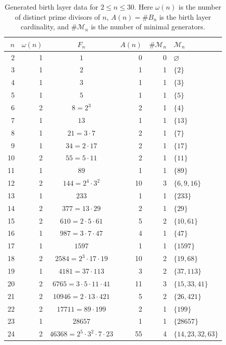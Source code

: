 \begin{table}[ht]
\centering
\small
\caption{Generated birth layer data for $2 \le n \le 30$. Here $\omega(n)$ is the number of distinct prime divisors of $n$, $A(n)=\#B_n$ is the birth layer cardinality, and $\#\mathcal{M}_n$ is the number of minimal generators.}
\label{tab:birth-layer-data-generated}
\begin{tabular}{rrcrrl}
\toprule
$n$ & $\omega(n)$ & $F_n$ & $A(n)$ & $\#\mathcal{M}_n$ & $\mathcal{M}_n$ \\
\midrule
  2 & 1 & $1$ & 0 & 0 & $\varnothing$ \\
  3 & 1 & $2$ & 1 & 1 & $\{2\}$ \\
  4 & 1 & $3$ & 1 & 1 & $\{3\}$ \\
  5 & 1 & $5$ & 1 & 1 & $\{5\}$ \\
  6 & 2 & $8 = 2^{3}$ & 2 & 1 & $\{4\}$ \\
  7 & 1 & $13$ & 1 & 1 & $\{13\}$ \\
  8 & 1 & $21 = 3 \cdot 7$ & 2 & 1 & $\{7\}$ \\
  9 & 1 & $34 = 2 \cdot 17$ & 2 & 1 & $\{17\}$ \\
  10 & 2 & $55 = 5 \cdot 11$ & 2 & 1 & $\{11\}$ \\
  11 & 1 & $89$ & 1 & 1 & $\{89\}$ \\
  12 & 2 & $144 = 2^{4} \cdot 3^{2}$ & 10 & 3 & $\{6,9,16\}$ \\
  13 & 1 & $233$ & 1 & 1 & $\{233\}$ \\
  14 & 2 & $377 = 13 \cdot 29$ & 2 & 1 & $\{29\}$ \\
  15 & 2 & $610 = 2 \cdot 5 \cdot 61$ & 5 & 2 & $\{10,61\}$ \\
  16 & 1 & $987 = 3 \cdot 7 \cdot 47$ & 4 & 1 & $\{47\}$ \\
  17 & 1 & $1597$ & 1 & 1 & $\{1597\}$ \\
  18 & 2 & $2584 = 2^{3} \cdot 17 \cdot 19$ & 10 & 2 & $\{19,68\}$ \\
  19 & 1 & $4181 = 37 \cdot 113$ & 3 & 2 & $\{37,113\}$ \\
  20 & 2 & $6765 = 3 \cdot 5 \cdot 11 \cdot 41$ & 11 & 3 & $\{15,33,41\}$ \\
  21 & 2 & $10946 = 2 \cdot 13 \cdot 421$ & 5 & 2 & $\{26,421\}$ \\
  22 & 2 & $17711 = 89 \cdot 199$ & 2 & 1 & $\{199\}$ \\
  23 & 1 & $28657$ & 1 & 1 & $\{28657\}$ \\
  24 & 2 & $46368 = 2^{5} \cdot 3^{2} \cdot 7 \cdot 23$ & 55 & 4 & $\{14,23,32,63\}$ \\

\end{tabular}
\end{table}
